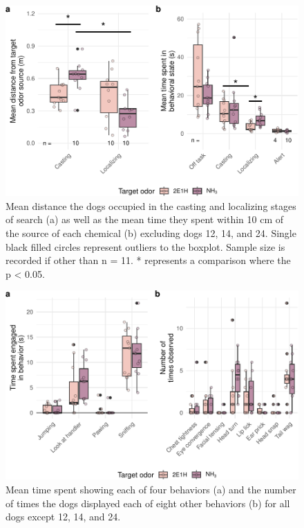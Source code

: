 \documentclass[
]{article}
\begin{document}
\begin{figure}
\centering
\includegraphics{supplementary-info_files/figure-latex/hole-times-1.pdf}
\caption{\label{fig:hole-times}Mean distance the dogs occupied in the casting and localizing stages of search (a) as well as the mean time they spent within 10 cm of the source of each chemical (b) excluding dogs 12, 14, and 24. Single black filled circles represent outliers to the boxplot. Sample size is recorded if other than n = 11. * represents a comparison where the p \textless{} 0.05.}
\end{figure}

\begin{figure}
\centering
\includegraphics{supplementary-info_files/figure-latex/indiv-behavior-times-1.pdf}
\caption{\label{fig:indiv-behavior-times}Mean time spent showing each of four behaviors (a) and the number of times the dogs displayed each of eight other behaviors (b) for all dogs except 12, 14, and 24.}
\end{figure}
\end{document}
